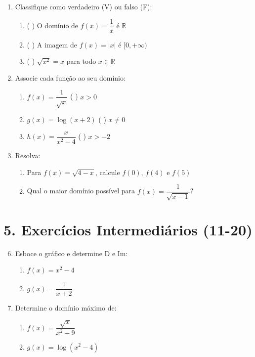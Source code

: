 \documentclass[11pt]{article}
\begin{document}
\begin{multicols}{2}
\begin{enumerate}
    \item Classifique como verdadeiro (V) ou falso (F):
    \begin{enumerate}[label=\alph*)]
        \item ( ) O domínio de $f(x) = \dfrac{1}{x}$ é $\mathbb{R}$
        \item ( ) A imagem de $f(x) = |x|$ é $[0, +\infty)$
        \item ( ) $\sqrt{x^2} = x$ para todo $x \in \mathbb{R}$
    \end{enumerate}
    
    \item Associe cada função ao seu domínio:
    \begin{enumerate}[label=\alph*)]
        \item $f(x) = \dfrac{1}{\sqrt{x}}$ \hspace{0.5cm} ( ) $x > 0$
        \item $g(x) = \log(x+2)$ \hspace{0.5cm} ( ) $x \neq 0$
        \item $h(x) = \dfrac{x}{x^2-4}$ \hspace{0.5cm} ( ) $x > -2$
    \end{enumerate}
    
    \item Resolva:
    \begin{enumerate}[label=\alph*)]
        \item Para $f(x) = \sqrt{4-x}$, calcule $f(0)$, $f(4)$ e $f(5)$
        \item Qual o maior domínio possível para $f(x) = \dfrac{1}{\sqrt{x-1}}$?
    \end{enumerate}
\end{enumerate}

\section*{5. Exercícios Intermediários (11-20)}
\begin{enumerate}\setcounter{enumi}{5}
    \item Esboce o gráfico e determine D e Im:
    \begin{enumerate}[label=\alph*)]
        \item $f(x) = x^2 - 4$
        \item $g(x) = \dfrac{1}{x+2}$
    \end{enumerate}
    
    \item Determine o domínio máximo de:
    \begin{enumerate}[label=\alph*)]
        \item $f(x) = \dfrac{\sqrt{x}}{x^2-9}$
        \item $g(x) = \log(x^2 - 4)$
    \end{enumerate}
    

\end{enumerate}
\end{multicols}
\end{document}
